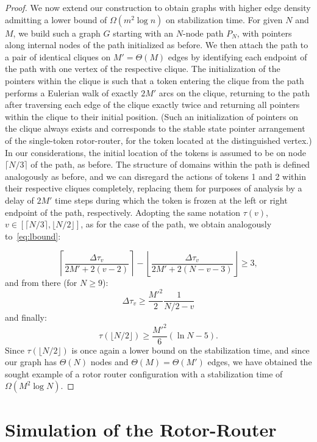 \documentclass{article}[11pt,letter]
\begin{document}
\begin{proof}
We now extend our construction to obtain graphs with higher edge density admitting a lower bound of $\Omega(m^2 \log n)$ on stabilization time. For given $N$ and $M$, we build such a graph $G$ starting with an $N$-node path $P_N$, with pointers along internal nodes of the path initialized as before. We then attach the path to a pair of identical cliques on $M'=\Theta(M)$ edges by identifying each endpoint of the path with one vertex of the respective clique. The initialization of the pointers within the clique is such that a token entering the clique from the path performs a Eulerian walk of exactly $2M'$ arcs on the clique, returning to the path after traversing each edge of the clique exactly twice and returning all pointers within the clique to their initial position. (Such an initialization of pointers on the clique always exists and corresponds to the stable state pointer arrangement of the single-token rotor-router, for the token located at the distinguished vertex.) In our considerations, the initial location of the tokens is assumed to be on node $\lceil N/3\rceil$ of the path, as before. The structure of domains within the path is defined analogously as before, and we can disregard the actions of tokens 1 and 2 within their respective cliques completely, replacing them for purposes of analysis by a delay of $2M'$ time steps during which the token is frozen at the left or right endpoint of the path, respectively. Adopting the same notation $\tau(v)$, $v\in [\lceil N/3\rceil,\lfloor N/2 \rfloor]$, as for the case of the path, we obtain analogously to~\eqref{eq:lbound}:

$$
\left\lceil \frac{\Delta \tau_v}{2M' + 2(v-2)}\right\rceil - \left\lfloor \frac{\Delta \tau_v}{2M' + 2(N-v-3)}\right\rfloor \geq 3,
$$
and from there (for $N\geq 9$):
$$
\Delta \tau_v \geq \frac{M'^2}{2} \frac{1}{N/2 - v}
$$
and finally:
$$
\tau(\lfloor N/2\rfloor) \geq \frac{M'^2}{6}(\ln N - 5).
$$
Since $\tau(\lfloor N/2\rfloor)$ is once again a lower bound on the stabilization time, and since our graph has $\Theta (N)$ nodes and $\Theta(M) = \Theta(M')$ edges, we have obtained the sought example of a rotor router configuration with a stabilization time of $\Omega(M^2 \log N)$.

\end{proof}

\section{Simulation of the Rotor-Router}
\end{document}
